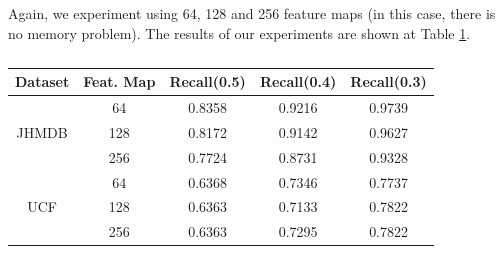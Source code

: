 Again, we experiment using 64, 128 and 256 feature maps (in this case, there is no memory problem). The results of our experiments are shown at Table \ref{table:reg_2_2}.


\begin{table}[h]
  \centering
  \begin{tabular}{||c | c || c  c  c||}
    \hline
    \textbf{Dataset}  & \textbf{Feat. Map} & \textbf{Recall(0.5)} & \textbf{Recall(0.4)} & \textbf{Recall(0.3)}\\
    \hline
    \multirow{3}{*}{JHMDB} & 64 & 0.8358 & 0.9216 & 0.9739\\
    \cline{2-5}
    {} & 128 & 0.8172 & 0.9142 & 0.9627 \\
    \cline{2-5}
    {} & 256 & 0.7724 & 0.8731 & 0.9328 \\
    \hline
    \multirow{3}{*}{UCF} & 64 & 0.6368 & 0.7346 & 0.7737 \\ 
    \cline{2-5}
    {} & 128 & 0.6363 & 0.7133 & 0.7822 \\
    \cline{2-5}
    {} & 256 &  0.6363 & 0.7295 & 0.7822 \\
    \hline

  \end{tabular}
  \caption{}
  \label{table:reg_2_2}
\end{table}

